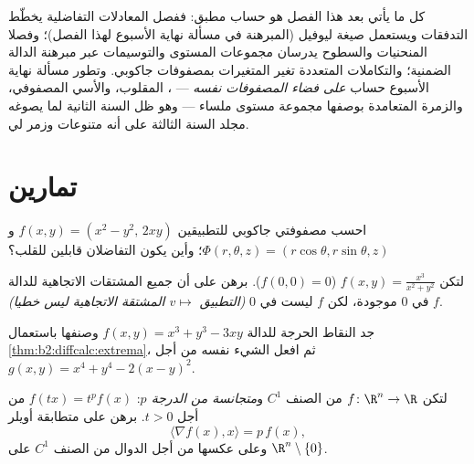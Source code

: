 \begin{remark}
كل ما يأتي بعد هذا الفصل هو حساب  مطبق: ففصل المعادلات
التفاضلية يخطّط التدفقات ويستعمل صيغة ليوفيل  (المبرهنة في
مسألة نهاية الأسبوع لهذا الفصل)؛ وفصلا المنحنيات والسطوح يدرسان
مجموعات المستوى والتوسيمات عبر مبرهنة الدالة الضمنية؛ والتكاملات
المتعددة تغير المتغيرات بمصفوفات جاكوبي.
وتطور مسألة نهاية الأسبوع حساب  \emph{على فضاء المصفوفات
نفسه} ---  ،  المقلوب، والأسي المصفوفي، والزمرة
المتعامدة بوصفها مجموعة مستوى ملساء --- وهو ظل السنة الثانية لما
يصوغه مجلد السنة الثالثة على أنه متنوعات وزمر لي.
\end{remark}

\section{تمارين}

\begin{exercise}[$\star$]\label{exo:b2:diffcalc:1}
احسب مصفوفتي جاكوبي للتطبيقين $f(x,y) = (x^2 - y^2,\, 2xy)$ و$\Phi(r,\theta,z) = (r\cos\theta, r\sin\theta, z)$؛ وأين يكون التفاضلان
قابلين للقلب؟
\end{exercise}

\begin{exercise}[$\star$]\label{exo:b2:diffcalc:2}
لتكن $f(x,y) = \frac{x^3}{x^2 + y^2}$ ($f(0,0) = 0$). برهن على أن جميع المشتقات الاتجاهية للدالة
$f$ في $0$ موجودة، لكن $f$ ليست  في $0$
\emph{(التطبيق $v \mapsto$ المشتقة الاتجاهية ليس خطيا)}.
\end{exercise}

\begin{exercise}[$\star$]\label{exo:b2:diffcalc:3}
جد النقاط الحرجة للدالة $f(x, y) = x^3 + y^3 -
3xy$ وصنفها باستعمال \cref{thm:b2:diffcalc:extrema}، ثم افعل
الشيء نفسه من أجل $g(x,y) = x^4 +
y^4 - 2(x - y)^2$.
\end{exercise}

\begin{exercise}[$\star\star$]\label{exo:b2:diffcalc:4}
لتكن $f \colon \R^n \to \R$ من الصنف $C^1$ و\emph{متجانسة من الدرجة $p$}:
$f(tx) = t^pf(x)$ من أجل $t > 0$. برهن على متطابقة أويلر
\[
\langle \nabla f(x), x\rangle = p\,f(x) ,
\]
وعلى عكسها من أجل الدوال من الصنف $C^1$ على $\R^n\setminus\{0\}$.
\end{exercise}

